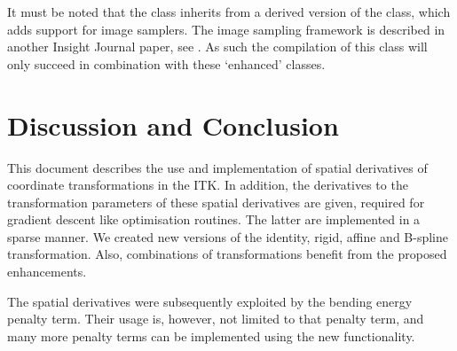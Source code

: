\documentclass{InsightArticle}
\begin{document}
It must be noted that the
 class inherits from a
derived version of the  class, which
adds support for image samplers. The image sampling framework is
described in another Insight Journal paper, see \cite{Staring10}. As
such the compilation of this class will only succeed in combination
with these `enhanced' classes.


\section{Discussion and Conclusion}

This document describes the use and implementation of spatial
derivatives of coordinate transformations in the ITK. In addition,
the derivatives to the transformation parameters of these spatial
derivatives are given, required for gradient descent like
optimisation routines. The latter are implemented in a sparse
manner. We created new versions of the identity, rigid, affine and
B-spline transformation. Also, combinations of transformations
benefit from the proposed enhancements.

The spatial derivatives were subsequently exploited by the bending
energy penalty term. Their usage is, however, not limited to that
penalty term, and many more penalty terms can be implemented using
the new functionality.

%
%



\end{document}

